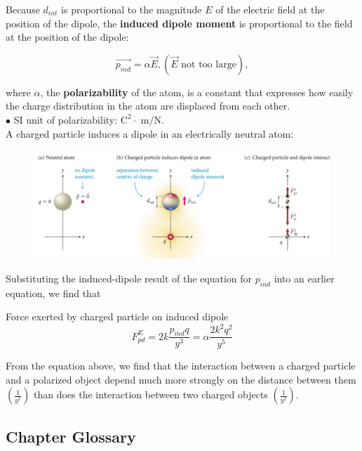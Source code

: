         Because $d_{int}$ is proportional to the magnitude $E$ of the electric field at the position of the dipole, the \textbf{induced dipole moment} is proportional to the field at the position of the dipole:

        \[
            \vec{p_{ind}} = \alpha \vec{E}, (\vec{E}\text{ not too large}),
        \]

        where $\alpha$, the \textbf{polarizability} of the atom, is a constant that expresses how easily the charge distribution in the atom are displaced from each other. \\
        $\bullet$ SI unit of polarizability: $\text{C}^2 \cdot \text{ m/N}$. \\

        A charged particle induces a dipole in an electrically neutral atom:
        \begin{figure}[hbt!]
            \centering
            \includegraphics[scale = 0.5]{Resources/12.8_Induction_Dipole_Particle}
        \end{figure}

        Substituting the induced-dipole result of the equation for $p_{ind}$ into an earlier equation, we find that

        \begin{axiom}{Force exerted by charged particle on induced dipole}
            \[
                F^E_{pd} = 2k \frac{p_{ind}q}{y^3} = \alpha \frac{2k^2 q^2}{y^5}
            \]
        \end{axiom}

        From the equation above, we find that the interaction between a charged particle and a polarized object depend much more strongly on the distance between them $\left(\frac{1}{y^5}\right)$ than does the
        interaction between two charged objects $\left(\frac{1}{y^2}\right)$.

    \subsection{Chapter Glossary}

